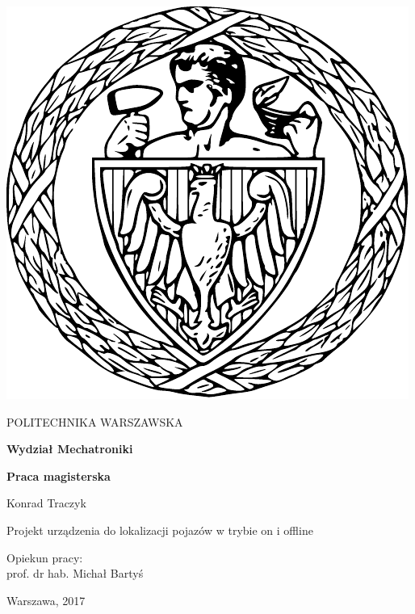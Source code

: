 
\thispagestyle {empty}

\begin{center}
	\includegraphics[scale=0.4]{img/pw}
	
	\vspace{0.5cm}
	
	{\fontsize{20}{20}\selectfont POLITECHNIKA WARSZAWSKA}
	
	\vspace{1.0cm}
	
	\textbf{{\fontsize{14}{14}\selectfont Wydział Mechatroniki}}
	
	\vspace{1.5cm}
	
	\textbf{{\fontsize{14}{14}\selectfont Praca magisterska}}

	\vspace{2.0cm}
	
	{\fontsize{14}{14}\selectfont Konrad Traczyk}
	
	\vspace{1cm}
	
	{\fontsize{28}{28}\selectfont Projekt urządzenia do lokalizacji pojazów w trybie on i offline}
	
	\vspace{1cm}
	\begin{flushright}
		{\fontsize{14}{14}\selectfont Opiekun pracy: \\ 
		prof. dr hab. Michał Bartyś}
	
		\vspace{1cm}
		

		
	\end{flushright}
	
	\vspace{1cm}
	
	{\fontsize{12}{12}\selectfont Warszawa, 2017}
	
	
\end{center}